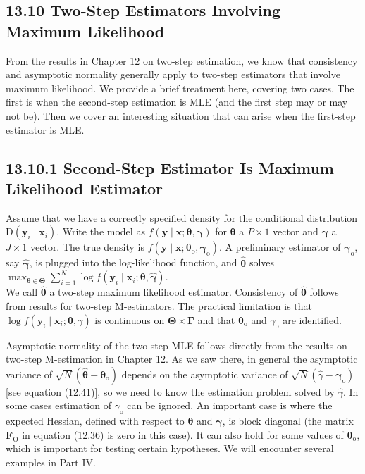 \documentclass[10pt]{article}
\begin{document}
\subsection*{13.10 Two-Step Estimators Involving Maximum Likelihood}
From the results in Chapter 12 on two-step estimation, we know that consistency and asymptotic normality generally apply to two-step estimators that involve maximum likelihood. We provide a brief treatment here, covering two cases. The first is when the second-step estimation is MLE (and the first step may or may not be). Then we cover an interesting situation that can arise when the first-step estimator is MLE.

\subsection*{13.10.1 Second-Step Estimator Is Maximum Likelihood Estimator}
Assume that we have a correctly specified density for the conditional distribution $\mathrm{D}\left(\mathbf{y}_{i} \mid \mathbf{x}_{i}\right)$. Write the model as $f(\mathbf{y} \mid \mathbf{x} ; \boldsymbol{\theta}, \boldsymbol{\gamma})$ for $\boldsymbol{\theta}$ a $P \times 1$ vector and $\boldsymbol{\gamma}$ a $J \times 1$ vector. The true density is $f\left(\mathbf{y} \mid \mathbf{x} ; \boldsymbol{\theta}_{\mathrm{o}}, \boldsymbol{\gamma}_{\mathrm{o}}\right)$. A preliminary estimator of $\boldsymbol{\gamma}_{\mathrm{o}}$, say $\hat{\boldsymbol{\gamma}}$, is plugged into the log-likelihood function, and $\hat{\boldsymbol{\theta}}$ solves\\
$\max _{\boldsymbol{\theta} \in \boldsymbol{\Theta}} \sum_{i=1}^{N} \log f\left(\mathbf{y}_{i} \mid \mathbf{x}_{i} ; \boldsymbol{\theta}, \hat{\boldsymbol{\gamma}}\right)$.\\
We call $\hat{\boldsymbol{\theta}}$ a two-step maximum likelihood estimator. Consistency of $\hat{\boldsymbol{\theta}}$ follows from results for two-step M-estimators. The practical limitation is that $\log f\left(\mathbf{y}_{i} \mid \mathbf{x}_{i} ; \boldsymbol{\theta}, \gamma\right)$ is continuous on $\boldsymbol{\Theta} \times \boldsymbol{\Gamma}$ and that $\boldsymbol{\theta}_{\mathrm{o}}$ and $\gamma_{\mathrm{o}}$ are identified.

Asymptotic normality of the two-step MLE follows directly from the results on two-step M-estimation in Chapter 12. As we saw there, in general the asymptotic variance of $\sqrt{N}\left(\hat{\boldsymbol{\theta}}-\boldsymbol{\theta}_{\mathrm{o}}\right)$ depends on the asymptotic variance of $\sqrt{N}\left(\hat{\gamma}-\boldsymbol{\gamma}_{\mathrm{o}}\right)$ [see equation (12.41)], so we need to know the estimation problem solved by $\hat{\gamma}$. In some cases estimation of $\gamma_{\mathrm{o}}$ can be ignored. An important case is where the expected Hessian, defined with respect to $\boldsymbol{\theta}$ and $\boldsymbol{\gamma}$, is block diagonal (the matrix $\mathbf{F}_{\mathrm{O}}$ in equation (12.36) is zero in this case). It can also hold for some values of $\boldsymbol{\theta}_{\mathrm{o}}$, which is important for testing certain hypotheses. We will encounter several examples in Part IV.
\end{document}
